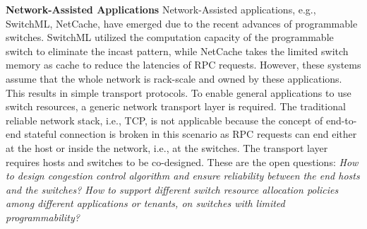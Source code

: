\documentclass[10pt]{article}
\begin{document}

\textbf{Network-Assisted Applications}
Network-Assisted applications, e.g., SwitchML, NetCache,  
have emerged due to the recent advances of programmable
switches. SwitchML utilized the computation capacity of the programmable switch 
to eliminate the incast pattern, while NetCache takes
the limited switch memory as cache to reduce the latencies of RPC requests.
However, these systems assume that the whole network is rack-scale and owned by these applications.
This results in simple transport protocols. To enable general applications to use switch resources, a generic network transport layer is required. The traditional reliable network stack, i.e., TCP, is not applicable because the concept of end-to-end stateful connection is broken in this scenario as RPC requests can end either at the host or inside the network, i.e., at the switches. The transport layer requires hosts and switches to be co-designed. These are the open questions: {\it How to design congestion control algorithm and ensure reliability between the end hosts and the switches? How to support different switch resource allocation policies among different applications or tenants, on switches with limited programmability?}
\end{document}
